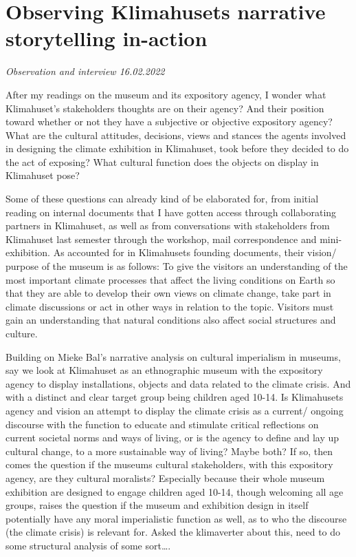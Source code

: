 

\section{Observing Klimahusets narrative storytelling in-action}
\par
\emph{Observation and interview 16.02.2022}
\par

After my readings on the museum and its expository agency, I wonder what Klimahuset’s stakeholders thoughts are on their agency? And their position toward whether or not they have a subjective or objective expository agency? What are the cultural attitudes, decisions, views and stances the agents involved in designing the climate exhibition in Klimahuset, took before they decided to do the act of exposing? What cultural function does the objects on display in Klimahuset pose? 

Some of these questions can already kind of be elaborated for, from initial reading on internal documents that I have gotten access through collaborating partners in Klimahuset, as well as from conversations with stakeholders from Klimahuset last semester through the workshop, mail correspondence and mini-exhibition. As accounted for in Klimahusets founding documents, their vision/ purpose of the museum is as follows:
To give the visitors an understanding of the most important climate processes that affect the living conditions on Earth so that they are able to develop their own views on climate change, take part in climate discussions or act in other ways in relation to the topic.
Visitors must gain an understanding that natural conditions also affect social structures and culture.
	
Building on Mieke Bal’s narrative analysis on cultural imperialism in museums, say we look at Klimahuset as an ethnographic museum with the expository agency to display installations, objects and data related to the climate crisis. And with a distinct and clear target group being children aged 10-14. Is Klimahusets agency and vision an attempt to display the climate crisis as a current/ ongoing discourse with the function to educate and stimulate critical reflections on current societal norms and ways of living, or is the agency to define and lay up cultural change, to a more sustainable way of living? Maybe both? If so, then comes the question if the museums cultural stakeholders, with this expository agency, are they cultural moralists? Especially because their whole museum exhibition are designed to engage children aged 10-14, though welcoming all age groups, raises the question if the museum and exhibition design in itself potentially have any moral imperialistic function as well, as to who the discourse (the climate crisis) is relevant for. 
Asked the klimaverter about  this, need to do some structural analysis of some sort….

